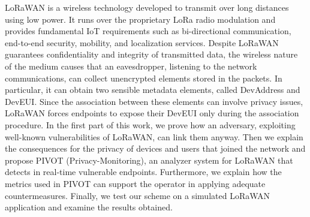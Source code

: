 LoRaWAN is a wireless technology developed to transmit over long distances using low power. It runs over the proprietary LoRa radio modulation and provides fundamental IoT requirements such as bi-directional communication, end-to-end security, mobility, and localization services. Despite LoRaWAN guarantees confidentiality and integrity of transmitted data, the wireless nature of the medium causes that an eavesdropper, listening to the network communications, can collect unencrypted elements stored in the packets. In particular, it can obtain two sensible metadata elements, called DevAddress and DevEUI. Since the association between these elements can involve privacy issues, LoRaWAN forces endpoints to expose their DevEUI only during the association procedure. In the first part of this work, we prove how an adversary, exploiting well-known vulnerabilities of LoRaWAN, can link them anyway. Then we explain the consequences for the privacy of devices and users that joined the network and propose PIVOT (Privacy-Monitoring), an analyzer system for LoRaWAN that detects in real-time vulnerable endpoints. Furthermore, we explain how the metrics used in PIVOT can support the operator in applying adequate countermeasures. Finally, we test our scheme on a simulated LoRaWAN application and examine the results obtained.